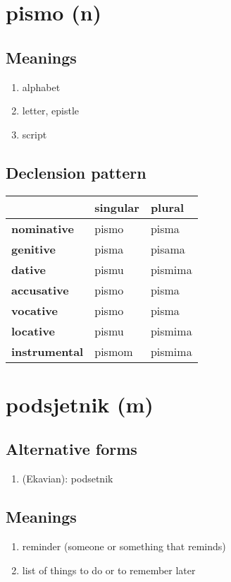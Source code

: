 \filbreak
\section{pismo (n)}
\subsection*{Meanings}
\begin{enumerate}
\item alphabet
\item letter, epistle
\item script
\end{enumerate}
\subsection*{Declension pattern}
\begin{tabularx}{\linewidth}{Xll}
\toprule
{} & singular &   plural \\
\midrule
\textbf{nominative  } &    pismo &    pisma \\
\textbf{genitive    } &    pisma &   pisama \\
\textbf{dative      } &    pismu &  pismima \\
\textbf{accusative  } &    pismo &    pisma \\
\textbf{vocative    } &    pismo &    pisma \\
\textbf{locative    } &    pismu &  pismima \\
\textbf{instrumental} &   pismom &  pismima \\
\bottomrule
\end{tabularx}

\filbreak
\section{podsjetnik (m)}
\subsection*{Alternative forms}
\begin{enumerate}
\item (Ekavian): podsetnik
\end{enumerate}
\subsection*{Meanings}
\begin{enumerate}
\item reminder (someone or something that reminds)
\item list of things to do or to remember later
\end{enumerate}

